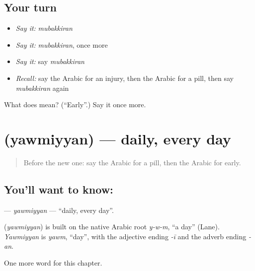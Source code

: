 \subsection*{Your turn}
\begin{itemize}
\raggedright
  \item \emph{Say it:} \emph{mubakkiran}
  \item \emph{Say it:} \emph{mubakkiran}, once more
  \item \emph{Say it:} say \emph{mubakkiran}
  \item \emph{Recall:} say the Arabic for an injury, then the Arabic for a pill, then say \emph{mubakkiran} again
\end{itemize}

\begin{tcolorbox}[breakable,colback=teal!4,colframe=teal!35!black,title={Before you move on}]
What does  mean? (\textquotedblleft{}Early\textquotedblright{}.) Say it once more.
\end{tcolorbox}
\section[\texorpdfstring{\ar{يوميا} (yawmiyyan)}{يوميا (yawmiyyan)}]{ (yawmiyyan) — daily, every day}

\label{lesson:AR-C170-yawmiyyan}



\begin{quote}
Before the new one: say the Arabic for a pill, then the Arabic for early.
\end{quote}

\subsection*{You'll want to know: }
\textbf{} — \emph{yawmiyyan} — \textquotedblleft{}daily, every day\textquotedblright{}.

\begin{cousinweb}
\textbf{} (\emph{yawmiyyan}) is built on the native Arabic root \emph{y-w-m}, \textquotedblleft{}a day\textquotedblright{} (Lane). \emph{Yawmiyyan} is \emph{yawm}, \textquotedblleft{}day\textquotedblright{}, with the adjective ending \emph{-ī} and the adverb ending \emph{-an}.
\end{cousinweb}

\begin{grammarlens}[title={What you've built}]
One more word for this chapter.
\end{grammarlens}


